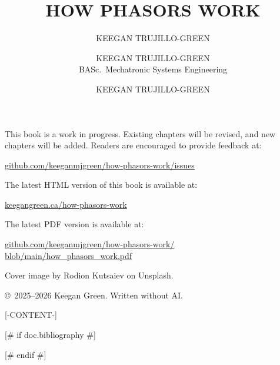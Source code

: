 \documentclass[oneside]{book}
\title{HOW PHASORS WORK}
\author{KEEGAN TRUJILLO-GREEN}
\begin{document}


\newpage \thispagestyle{empty}

\begin{titlepage}
  \author{KEEGAN TRUJILLO-GREEN \\ BASc.\ Mechatronic Systems Engineering}
  \date{}
  \maketitle
  \author{KEEGAN TRUJILLO-GREEN}
\end{titlepage}

\thispagestyle{empty}

This book is a work in progress. Existing chapters will be revised, and new chapters will be added. Readers are encouraged to provide feedback at:

\href{https://github.com/keeganmjgreen/how-phasors-work/issues}{github.com/keeganmjgreen/how-phasors-work/issues}

The latest HTML version of this book is available at:

\href{https://keegangreen.ca/how-phasors-work}{keegangreen.ca/how-phasors-work}

The latest PDF version is available at:

\href{https://raw.githubusercontent.com/keeganmjgreen/how-phasors-work/refs/heads/main/how_phasors_work.pdf}{github.com/keeganmjgreen/how-phasors-work/} \\ \href{https://raw.githubusercontent.com/keeganmjgreen/how-phasors-work/refs/heads/main/how_phasors_work.pdf}{blob/main/how\_phasors\_work.pdf}

Cover image by Rodion Kutsaiev on Unsplash.

\copyright \ 2025--2026 Keegan Green. Written without AI.

\newpage

\tableofcontents

\newpage

[-CONTENT-]

[# if doc.bibliography #]
\begin{flushleft}

\end{flushleft}
[# endif #]


\end{document}
